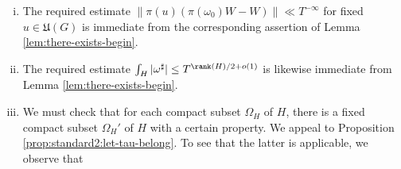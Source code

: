 \begin{enumerate}[(i)]
  By \eqref{eq:cunvjucq6r} and the identity $\rho_{N_H}^\vee = - \rho_{U_H}^\vee$, we obtain
  \begin{equation*}
    W[f[s], \psi^{-1}](T^{\rho_{N_H}^\vee} g) = T^{e(H)/2 - \rho_{U_H}^\vee(s)} W[f[s], \psi_T^{-1}](g).
  \end{equation*}
  Using also $W_1(a_T g)=W_T(g)$, we obtain the desired comparison
  \begin{equation}\label{eq:z_1w_1-f-s}
    Z(W_1,f[s]) =
    T^{\rank(G) \trace(s)/2 - e(H)/2 - \rho_{U_H}^\vee(s)}
    Z_T(W_T, f[s]).
  \end{equation}
  By Lemma \ref{lem:there-exists-begin} and \eqref{eq:z_1w_1-f-s}, we obtain
  \begin{equation}\label{eq:z_1w-f-0}
    Z(W,f[0]) \gg Z(c_1 W_1, f, 0) \gg c_1 c_2 T^{-e(H)/2 -\dim(N_H)/2}
  \end{equation}
  and, for $\Re(s) \ll 1$,
  \begin{equation}\label{eq:z_1w-f-s}
    Z(W,f[s]) \ll c_1 c_2 T^{-e(H)/2  - \dim(N_H)/2 + \rank(G) \trace(s)/2 + o(1)} \langle s \rangle^{-\infty}.
  \end{equation}
  We calculate
  \begin{equation*}
    c_1 c_2 T^{-e(H)/2 - \dim(N_H)/2}
    \asymp
    T^{ - \dim(Q_H)/4 - \dim(N_H)/4}
    =
    T^{-\dim(H)/4}.
  \end{equation*}
  With this calculation, assertion \eqref{itm:sub-gln:8} of Theorem \ref{thm:main-local-results}, namely that
  \begin{equation*}
    Z(W,f[0]) \gg T^{- \dim(H)/4},
  \end{equation*}
  \begin{equation*}
    \Re(s) \ll 1 \implies Z(W,f[s]) \ll  T^{\rank(G) \trace(s)/2 - \dim(H)/4 + o(1) }
    (1 + |s|)^{-\infty },
  \end{equation*}
  follows from \eqref{eq:z_1w-f-0} and \eqref{eq:z_1w-f-s}.
\item The required estimate $\|\pi(u) ( \pi(\omega_0) W - W)\| \ll T^{-\infty}$ for fixed $u \in \mathfrak{U}(G)$ is immediate from the corresponding assertion of Lemma \ref{lem:there-exists-begin}.
\item The required estimate $\int_{H} |\omega^\sharp| \leq T^{\rank(H)/2 + o(1)}$ is likewise immediate from Lemma \ref{lem:there-exists-begin}.
\item We must check that for each compact subset $\Omega_H$ of $H$, there is a fixed compact subset $\Omega_H'$ of $H$ with a certain property.  We appeal to Proposition \ref{prop:standard2:let-tau-belong}.  To see that the latter is applicable, we observe that

\end{enumerate}
